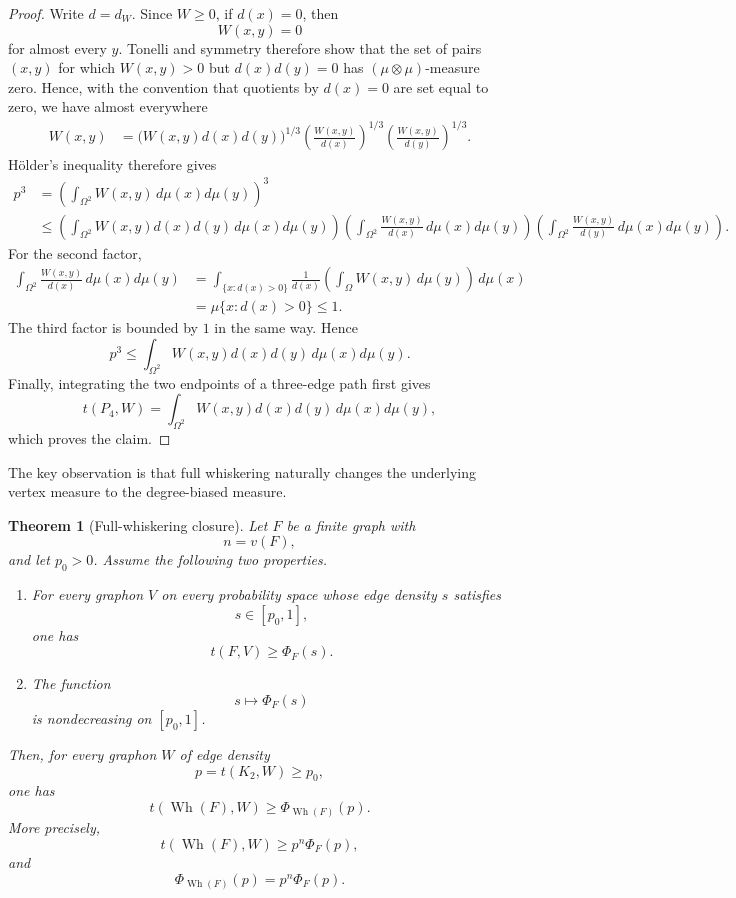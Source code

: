 \documentclass[11pt]{article}
\newtheorem{theorem}{Theorem}
\begin{document}
\begin{proof}
Write $d=d_W$. Since $W\ge0$, if $d(x)=0$, then
\[
    W(x,y)=0
\]
for almost every $y$.  Tonelli and symmetry therefore show that the
set of pairs $(x,y)$ for which $W(x,y)>0$ but $d(x)d(y)=0$ has
$(\mu\otimes\mu)$-measure zero.  Hence, with the convention that
quotients by $d(x)=0$ are set equal to zero, we have almost everywhere
\[
\begin{aligned}
    W(x,y)
    &=
    \bigl(W(x,y)d(x)d(y)\bigr)^{1/3}
    \left(\frac{W(x,y)}{d(x)}\right)^{1/3}
    \left(\frac{W(x,y)}{d(y)}\right)^{1/3}.
\end{aligned}
\]
H\"older's inequality therefore gives
\[
\begin{aligned}
    p^3
    &=
    \left(\int_{\Omega^2}W(x,y)\,d\mu(x)d\mu(y)\right)^3
    \\
    &\le
    \left(
      \int_{\Omega^2}
      W(x,y)d(x)d(y)\,d\mu(x)d\mu(y)
    \right)
    \left(
      \int_{\Omega^2}
      \frac{W(x,y)}{d(x)}\,d\mu(x)d\mu(y)
    \right)
    \left(
      \int_{\Omega^2}
      \frac{W(x,y)}{d(y)}\,d\mu(x)d\mu(y)
    \right).
\end{aligned}
\]
For the second factor,
\[
\begin{aligned}
    \int_{\Omega^2}
      \frac{W(x,y)}{d(x)}\,d\mu(x)d\mu(y)
    &=
    \int_{\{x:d(x)>0\}}
       \frac{1}{d(x)}
       \left(\int_\Omega W(x,y)\,d\mu(y)\right)\,d\mu(x)
    \\
    &=
    \mu\{x:d(x)>0\}
    \le 1.
\end{aligned}
\]
The third factor is bounded by $1$ in the same way. Hence
\[
    p^3
    \le
    \int_{\Omega^2}
      W(x,y)d(x)d(y)\,d\mu(x)d\mu(y).
\]
Finally, integrating the two endpoints of a three-edge path first gives
\[
    t(P_4,W)
    =
    \int_{\Omega^2}
      W(x,y)d(x)d(y)\,d\mu(x)d\mu(y),
\]
which proves the claim.
\end{proof}

The key observation is that full whiskering naturally changes the
underlying vertex measure to the degree-biased measure.

\begin{theorem}[Full-whiskering closure]\label{thm:whiskering}
Let $F$ be a finite graph with
\[
    n=v(F),
\]
and let $p_0>0$. Assume the following two properties.

\begin{enumerate}
    \item For every graphon $V$ on every probability space whose edge
    density $s$ satisfies
    \[
        s\in[p_0,1],
    \]
    one has
    \[
        t(F,V)\ge \Phi_F(s).
    \]

    \item The function
    \[
        s\longmapsto \Phi_F(s)
    \]
    is nondecreasing on $[p_0,1]$.
\end{enumerate}

Then, for every graphon $W$ of edge density
\[
    p=t(K_2,W)\ge p_0,
\]
one has
\[
    t(\operatorname{Wh}(F),W)
    \ge
    \Phi_{\operatorname{Wh}(F)}(p).
\]
More precisely,
\[
    t(\operatorname{Wh}(F),W)
    \ge
    p^n\Phi_F(p),
\]
and
\[
    \Phi_{\operatorname{Wh}(F)}(p)
    =
    p^n\Phi_F(p).
\]
\end{theorem}
\end{document}

